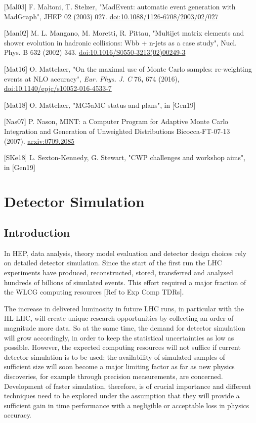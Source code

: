 \documentclass[11pt,a4paper]{article}
\begin{document}
{[}Mal03{]} F. Maltoni, T. Stelzer, "MadEvent: automatic event
generation with MadGraph", JHEP 02 (2003) 027.
\href{https://doi.org/10.1088/1126-6708/2003/02/027}{{doi:10.1088/1126-6708/2003/02/027}}

{[}Man02{]} M. L. Mangano, M. Moretti, R. Pittau, "Multijet matrix
elements and shower evolution in hadronic collisions: Wbb + n-jets as a
case study", Nucl. Phys. B 632 (2002) 343.
\href{https://doi.org/10.1016/S0550-3213(02)00249-3}{{doi:10.1016/S0550-3213(02)00249-3}}

{[}Mat16{]} O. Mattelaer, "On the maximal use of Monte Carlo samples:
re-weighting events at NLO accuracy", \emph{Eur. Phys. J. C}
76\textbf{,} 674 (2016),
\href{https://doi.org/10.1140/epjc/s10052-016-4533-7}{{doi:10.1140/epjc/s10052-016-4533-7}}

{[}Mat18{]} O. Mattelaer, "MG5aMC status and plans", in {[}Gen19{]}

{[}Nas07{]} P. Nason, MINT: a Computer Program for Adaptive Monte Carlo
Integration and Generation of Unweighted Distributions Bicocca-FT-07-13
(2007). \href{https://arxiv.org/abs/0709.2085}{{arxiv:0709.2085}}

{[}SKe18{]} L. Sexton-Kennedy, G. Stewart, "CWP challenges and workshop
aims", in {[}Gen19{]}

\hypertarget{detector-simulation}{%
\section{Detector Simulation}\label{detector-simulation}}

\hypertarget{introduction-2}{%
\subsection{Introduction}\label{introduction-2}}

In HEP, data analysis, theory model evaluation and detector design
choices rely on detailed detector simulation. Since the start of the
first run the LHC experiments have produced, reconstructed, stored,
transferred and analysed hundreds of billions of simulated events. This
effort required a major fraction of the WLCG computing resources {[}Ref
to Exp Comp TDRs{]}.

The increase in delivered luminosity in future LHC runs, in particular
with the HL-LHC, will create unique research opportunities by collecting
an order of magnitude more data. So at the same time, the demand for
detector simulation will grow accordingly, in order to keep the
statistical uncertainties as low as possible. However, the expected
computing resources will not suffice if current detector simulation is
to be used; the availability of simulated samples of sufficient size
will soon become a major limiting factor as far as new physics
discoveries, for example through precision measurements, are concerned.
Development of faster simulation, therefore, is of crucial importance
and different techniques need to be explored under the assumption that
they will provide a sufficient gain in time performance with a
negligible or acceptable loss in physics accuracy.
\end{document}
